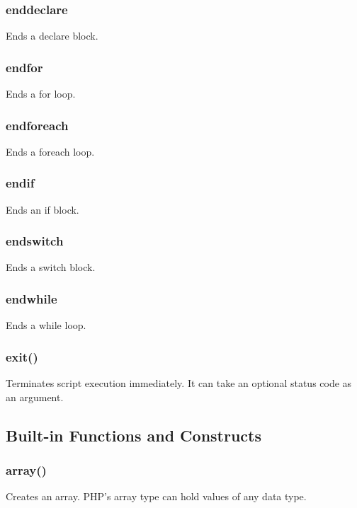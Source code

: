 \documentclass{report}
\begin{document}
    \bigbreak \noindent 
    \subsubsection{enddeclare}
    \bigbreak \noindent 
    Ends a declare block.

    \bigbreak \noindent 
    \subsubsection{endfor}
    \bigbreak \noindent 
    Ends a for loop.

    \bigbreak \noindent 
    \subsubsection{endforeach}
    \bigbreak \noindent 
    Ends a foreach loop.

    \bigbreak \noindent 
    \subsubsection{endif}
    \bigbreak \noindent 
    Ends an if block.

    \bigbreak \noindent 
    \subsubsection{endswitch}
    \bigbreak \noindent 
    Ends a switch block.

    \bigbreak \noindent 
    \subsubsection{endwhile}
    \bigbreak \noindent 
     Ends a while loop.

    \bigbreak \noindent 
    \subsubsection{exit()}
    \bigbreak \noindent 
    Terminates script execution immediately. It can take an optional status code as an argument.



    \pagebreak 
    \subsection{Built-in Functions and Constructs}
    \bigbreak \noindent 
    \subsubsection{array()}
    \bigbreak \noindent 
    Creates an array. PHP’s array type can hold values of any data type.
\end{document}
